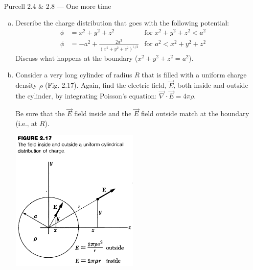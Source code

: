 \documentclass{esg8022pset}
\begin{document}
\begin{problem}{Purcell 2.4 \& 2.8 --- One more time}
  \begin{enumerate}[(a)]
    \item Describe the charge distribution that goes with the following potential: 
      \begin{align*}
        \phi & = x^2 + y^2 + z^2 & \text{for }x^2 + y^2 + z^2 < a^2 \\
        \phi & = -a^2 + \frac{2a^3}{(x^2 + y^2 + z^2)^{1/2}} & \text{for }a^2 < x^2 + y^2 + z^2
      \end{align*}
      Discuss what happens at the boundary ($x^2 + y^2 + z^2 = a^2$).
    \item Consider a very long cylinder of radius $R$ that is filled with a uniform charge density $\rho$ (Fig. 2.17).  Again, find the electric field, $\vec{E}$, both inside and outside the cylinder, by integrating Poisson's equation: $\vec{\nabla} \cdot \vec{E} = 4 \pi \rho$.
    
      Be sure that the $\vec E$ field inside and the $\vec E$ field outside match at the boundary (i.e., at $R$).
      \begin{center}\includegraphics[width=0.5\textwidth]{ps02_2}\end{center} 
  \end{enumerate}
\end{problem}
\end{document}
